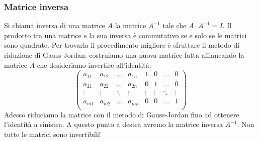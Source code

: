 \documentclass{article}     %
\begin{document}
\subsubsection{Matrice inversa}
Si chiama inversa di una matrice $A$ la matrice $A^{-1}$ tale che $A\cdot A^{-1}=I$. Il prodotto tra una matrice e la sua inversa è commutativo se e solo se le matrici sono quadrate. Per trovarla il procedimento migliore è sfruttare il metodo di riduzione di Gauss-Jordan: costruiamo una nuova matrice fatta affiancando la matrice $A$ che desideriamo invertire all'identità:
\[\left( \begin{array}{cccc|cccc}
    a_{11}& a_{12}&\dots&a_{1n}& 1&0&\dots &0\\
    a_{21}& a_{22}&\dots&a_{2n}& 0&1&\dots &0\\
    \vdots & \vdots & \ddots& \vdots& \vdots & \vdots & \ddots & \vdots\\
    a_{m1}& a_{m2}&\dots&a_{mn}& 0&0&\dots &1\\
\end{array} \right)\]
Adesso riduciamo la matrice con il metodo di Gauss-Jordan fino ad ottenere l'identità a sinistra. A questo punto a destra avremo la matrice inversa $A^{-1}$. Non tutte le matrici sono invertibili!
    \grid[4.9cm]{}
\end{ex}
\end{document}
